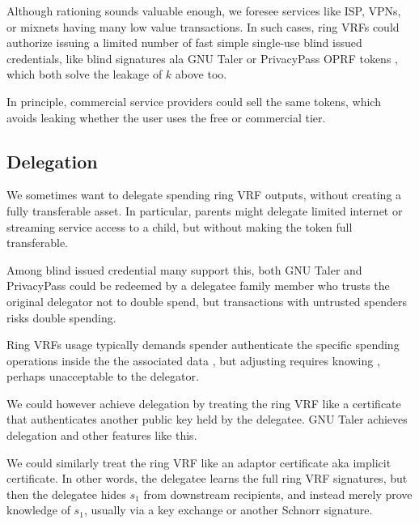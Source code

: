 Although rationing sounds valuable enough, we foresee services like ISP,
VPNs, or mixnets having many low value transactions.
In such cases, ring VRFs could authorize issuing a limited number of
fast simple single-use blind issued credentials, like blind signatures
ala GNU Taler \cite{taler} or PrivacyPass OPRF tokens \cite{PrivacyPass},
 which both solve the leakage of $k$ above too.

In principle, commercial service providers could sell the same tokens,
which avoids leaking whether the user uses the free or commercial tier.


\subsection{Delegation}

We sometimes want to delegate spending ring VRF outputs, without
creating a fully transferable asset.  In particular, parents might
delegate limited internet or streaming service access to a child,
but without making the token full transferable.

Among blind issued credential many support this, both
GNU Taler \cite{taler} and PrivacyPass \cite{PrivacyPass} could
be redeemed by a delegatee family member who trusts the original
delegator not to double spend, but transactions with untrusted spenders
risks double spending.  

Ring VRFs usage typically demands spender authenticate the specific
spending operations inside the the associated data \aux, but adjusting
\aux requires knowing \sk, perhaps unacceptable to the delegator.

We could however achieve delegation by treating the ring VRF like a
certificate that authenticates another public key held by the delegatee.
GNU Taler achieves delegation and other features like this.

We could similarly treat the ring VRF like an adaptor certificate aka
implicit certificate.  In other words, the delegatee learns the full
ring VRF signatures, but then the delegatee hides $s_1$ from downstream
recipients, and instead merely prove knowledge of $s_1$, usually via
a key exchange or another Schnorr signature.

